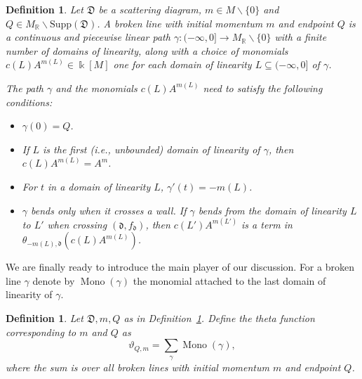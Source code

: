 \documentclass[11pt]{amsart}
\newtheorem{defn}[theorem]{Definition}
\theoremstyle{remark}
\numberwithin{equation}{section}
\newcommand{\RR}{\mathbb{R}}
\newcommand{\fd}{\mathfrak{d}}
\newcommand{\fD}{\mathfrak{D}}
\newcommand{\Mono}{\operatorname{Mono}}
\begin{document}
\begin{defn} 
  \label{brokendef}
  Let $\fD$ be a scattering diagram, $m \in M \backslash \{0\}$ and $Q \in
  M_{\RR} \backslash \text{Supp}(\fD)$.  A \emph{broken line} with initial
  momentum $m$ and endpoint $Q$ is a continuous and piecewise linear path
  $\gamma : ( - \infty , 0] \rightarrow M_{\mathbb{R}} \backslash \{ 0\} $ with
  a finite number of domains of linearity, along with a choice of monomials
  $c(L) A^{m(L)} \in \Bbbk[M]$ one for each domain of linearity $L \subseteq ( -
  \infty, 0]$ of $\gamma$. 
  
  The path $\gamma$ and the monomials $c(L) A^{m(L)}$ need to satisfy the
  following conditions:
  \begin{itemize}
    \item 
      $\gamma(0) = Q$.
    
    \item 
      If $L$ is the first (i.e., unbounded) domain of linearity of $\gamma$,
      then $c(L) A^{m(L)} = A^{m}$.

    \item 
      For $t$ in a domain of linearity $L$, $\gamma'(t) = -m(L)$.

    \item 
      $\gamma$ bends only when it crosses a wall. If $\gamma$ bends from the
      domain of linearity $L$ to $ L'$ when crossing $(\fd, f_{\fd})$, then
      $c(L')A^{m(L')}$ is a term in $\theta_{-m(L), \fd} \left(c(L)
        A^{m(L)}\right)$.  
  \end{itemize}
\end{defn}

We are finally ready to introduce the main player of our discussion.
For a broken line $\gamma$  denote by
$\Mono (\gamma)$ the monomial attached to the last domain of linearity of $\gamma$.
\begin{defn}
  Let $\fD, m, Q$ as in Definition~\ref{brokendef}.  Define the \emph{theta function} corresponding to $m$ and $Q$
  as
  \[ 
    \vartheta_{Q, m} = \sum_{\gamma} \Mono (\gamma), 
  \] 
  where the sum is over all broken lines with initial momentum $m$ and endpoint
  $Q$.
\end{defn}
\end{document}
